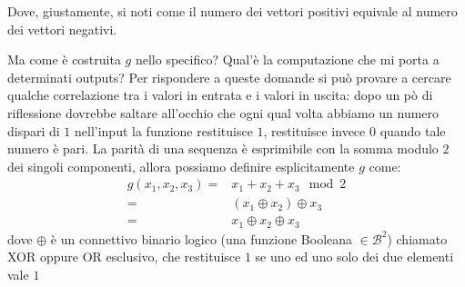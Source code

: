 \documentclass[12pt,a4paper,openright]{report}
\newcommand*\xor{\mathbin{\oplus}}
\begin{document}
\begin{center}
\end{center}
Dove, giustamente, si noti come il numero dei vettori positivi equivale al numero dei vettori negativi.\par
Ma come è costruita $g$ nello specifico? Qual'è la computazione che mi porta a determinati outputs?
Per rispondere a queste domande si può provare a cercare qualche correlazione tra i valori in entrata e i valori in uscita:
dopo un pò di riflessione dovrebbe saltare all'occhio che ogni qual volta abbiamo un numero dispari di $1$ nell'input la funzione 
restituisce $1$, restituisce invece $0$ quando tale numero è pari.
La parità di una sequenza è esprimibile con la somma modulo $2$ dei singoli componenti, allora possiamo definire esplicitamente $g$ come:
\begin{align*}
    g(x_1, x_2, x_3)= &x_1 + x_2 + x_3 \mod 2  \\
                    = &(x_1 \xor x_2) \xor x_3  \\
                    = &x_1 \xor x_2 \xor x_3
\end{align*}
dove $\xor$ è un connettivo binario logico (una funzione Booleana $\in \mathcal{B}^2$) chiamato XOR oppure OR esclusivo, che restituisce $1$ se uno ed uno solo dei due 
elementi vale $1$  
\end{document}
